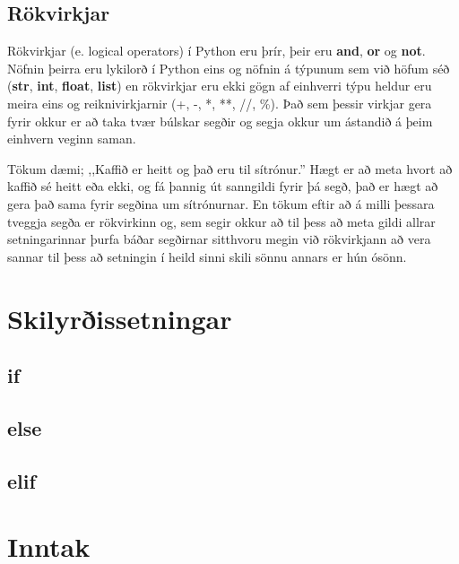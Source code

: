 \subsection{Rökvirkjar}
Rökvirkjar (e. logical operators) í Python eru þrír, þeir eru \textbf{and}, \textbf{or} og \textbf{not}.
Nöfnin þeirra eru lykilorð í Python eins og nöfnin á týpunum sem við höfum séð (\textbf{str}, \textbf{int}, \textbf{float}, \textbf{list}) en rökvirkjar eru ekki gögn af einhverri týpu heldur eru meira eins og reiknivirkjarnir (+, -, *, **, //, \%).
Það sem þessir virkjar gera fyrir okkur er að taka tvær búlskar segðir og segja okkur um ástandið á þeim einhvern veginn saman.

Tökum dæmi; ,,Kaffið er heitt og það eru til sítrónur.'' 
Hægt er að meta hvort að kaffið sé heitt eða ekki, og fá þannig út sanngildi fyrir þá segð, það er hægt að gera það sama fyrir segðina um sítrónurnar. En tökum eftir að á milli þessara tveggja segða er rökvirkinn og, sem segir okkur að til þess að meta gildi allrar setningarinnar þurfa báðar segðirnar sitthvoru megin við rökvirkjann að vera sannar til þess að setningin í heild sinni skili sönnu annars er hún ósönn.




\section{Skilyrðissetningar}
\subsection{if}
\subsection{else}
\subsection{elif}
\section{Inntak}